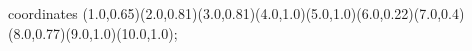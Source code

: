 					coordinates { (1.0,0.65)(2.0,0.81)(3.0,0.81)(4.0,1.0)(5.0,1.0)(6.0,0.22)(7.0,0.4)(8.0,0.77)(9.0,1.0)(10.0,1.0)};